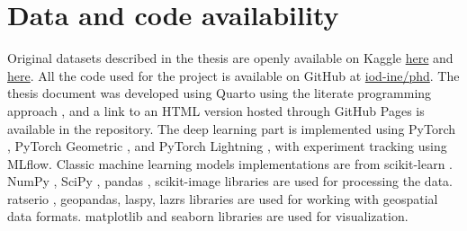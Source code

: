 \section{Data and code availability}

Original datasets described in the thesis are openly available on Kaggle \href{https://www.kaggle.com/datasets/sentinel3734/tree-detection-lidar-rgb}{here} and \href{https://www.kaggle.com/datasets/sentinel3734/uav-point-clouds-of-individual-trees}{here}.
All the code used for the project is available on GitHub at \href{https://github.com/iod-ine/phd}{iod-ine/phd}.
The thesis document was developed using Quarto \cite{Allaire_Quarto_2024} using the literate programming approach \cite{knuth84}, and a link to an HTML version hosted through GitHub Pages is available in the repository.
The deep learning part is implemented using PyTorch \cite{Ansel_PyTorch_2_Faster_2024}, PyTorch Geometric \cite{Fey_Fast_Graph_Representation_2019}, and PyTorch Lightning \cite{Falcon_PyTorch_Lightning_2019}, with experiment tracking using MLflow.
Classic machine learning models implementations are from scikit-learn \cite{scikit-learn}.
NumPy \cite{2020NumPy-Array}, SciPy \cite{2020SciPy-NMeth}, pandas \cite{The_pandas_development_team_pandas-dev_pandas_Pandas}, scikit-image \cite{van_der_Walt_scikit-image_image_processing_2014} libraries are used for processing the data.
ratserio \cite{gillies_2019}, geopandas, laspy, lazrs libraries are used for working with geospatial data formats.
matplotlib \cite{Hunter_Matplotlib_A_2D_2007} and seaborn \cite{waskomSeabornStatisticalData2021} libraries are used for visualization.
